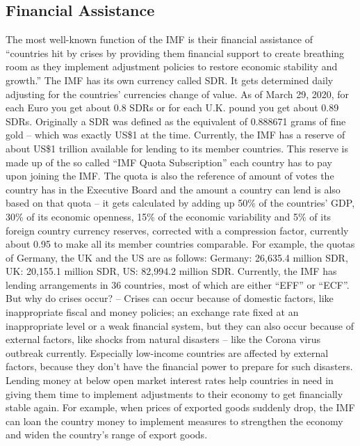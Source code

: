 \subsection{Financial Assistance}
The most well-known function of the \gls{IMF} is their financial assistance of \enquote{countries hit by crises by providing them financial support to create breathing room as they implement adjustment policies to restore economic stability and growth.}\cite{InternationalMonetaryFundIMFLending2020}
The \gls{IMF} has its own currency called \gls{SDR}. It gets determined daily adjusting for the countries’ currencies change of value. As of March 29, 2020, for each Euro you get about 0.8 \gls{SDR}s or for each U.K. pound you get about 0.89 \gls{SDR}s.\cite{InternationalMonetaryFundSDRsper2020} Originally a \gls{SDR} was defined as the equivalent of 0.888671 grams of fine gold – which was exactly US\$1 at the time.\cite{InternationalMonetaryFundSpecialDrawing2020} Currently, the \gls{IMF} has a reserve of about US\$1 trillion available for lending to its member countries.\cite{InternationalMonetaryFundTheIMF2019} This reserve is made up of the so called \enquote{IMF Quota Subscription} each country has to pay upon joining the \gls{IMF}. The quota is also the reference of amount of votes the country has in the Executive Board and the amount a country can lend is also based on that quota – it gets calculated by adding up 50\% of the countries’ GDP, 30\% of its economic openness, 15\% of the economic variability and 5\% of its foreign country currency reserves, corrected with a compression factor, currently about 0.95 to make all its member countries comparable. For example, the quotas of Germany, the UK and the US are as follows: Germany: 26,635.4 million \gls{SDR}, UK: 20,155.1 million \gls{SDR}, US: 82,994.2 million \gls{SDR}.\cite{InternationalMonetaryFundIMFMembers2020} Currently, the \gls{IMF} has lending arrangements in 36 countries, most of which are either \enquote{\gls{EFF}} or \enquote{\gls{ECF}}.\cite{InternationalMonetaryFundIMFLending2020b} 
But why do crises occur? – Crises can occur because of domestic factors, like inappropriate fiscal and money policies; an exchange rate fixed at an inappropriate level or a weak financial system, but they can also occur because of external factors, like shocks from natural disasters – like the Corona virus outbreak currently. Especially low-income countries are affected by external factors, because they don’t have the financial power to prepare for such disasters. Lending money at below open market interest rates help countries in need in giving them time to implement adjustments to their economy to get financially stable again. For example, when prices of exported goods suddenly drop, the \gls{IMF} can loan the country money to implement measures to strengthen the economy and widen the country’s range of export goods. 
